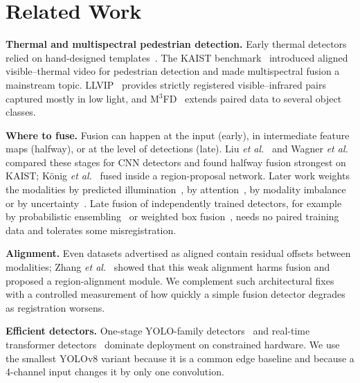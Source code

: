 \documentclass[conference]{IEEEtran}
\begin{document}
\section{Related Work}
\textbf{Thermal and multispectral pedestrian detection.} Early thermal detectors relied on hand-designed templates~\cite{davis2005thermal}. The KAIST benchmark~\cite{hwang2015kaist} introduced aligned visible--thermal video for pedestrian detection and made multispectral fusion a mainstream topic. LLVIP~\cite{jia2021llvip} provides strictly registered visible--infrared pairs captured mostly in low light, and M$^3$FD~\cite{liu2022tardal} extends paired data to several object classes.

\textbf{Where to fuse.} Fusion can happen at the input (early), in intermediate feature maps (halfway), or at the level of detections (late). Liu \emph{et al.}~\cite{liu2016multispectral} and Wagner \emph{et al.}~\cite{wagner2016fusion} compared these stages for CNN detectors and found halfway fusion strongest on KAIST; K\"onig \emph{et al.}~\cite{konig2017rpn} fused inside a region-proposal network. Later work weights the modalities by predicted illumination~\cite{li2019iafrcnn,guan2019illumination}, by attention~\cite{zhang2021gaff}, by modality imbalance~\cite{zhou2020mbnet} or by uncertainty~\cite{kim2022uncertainty}. Late fusion of independently trained detectors, for example by probabilistic ensembling~\cite{chen2022proben} or weighted box fusion~\cite{solovyev2021wbf}, needs no paired training data and tolerates some misregistration.

\textbf{Alignment.} Even datasets advertised as aligned contain residual offsets between modalities; Zhang \emph{et al.}~\cite{zhang2019arcnn} showed that this weak alignment harms fusion and proposed a region-alignment module. We complement such architectural fixes with a controlled measurement of how quickly a simple fusion detector degrades as registration worsens.

\textbf{Efficient detectors.} One-stage YOLO-family detectors~\cite{redmon2016yolo,jocher2023yolov8} and real-time transformer detectors~\cite{carion2020detr,zhao2024rtdetr} dominate deployment on constrained hardware. We use the smallest YOLOv8 variant because it is a common edge baseline and because a 4-channel input changes it by only one convolution.

\end{document}
